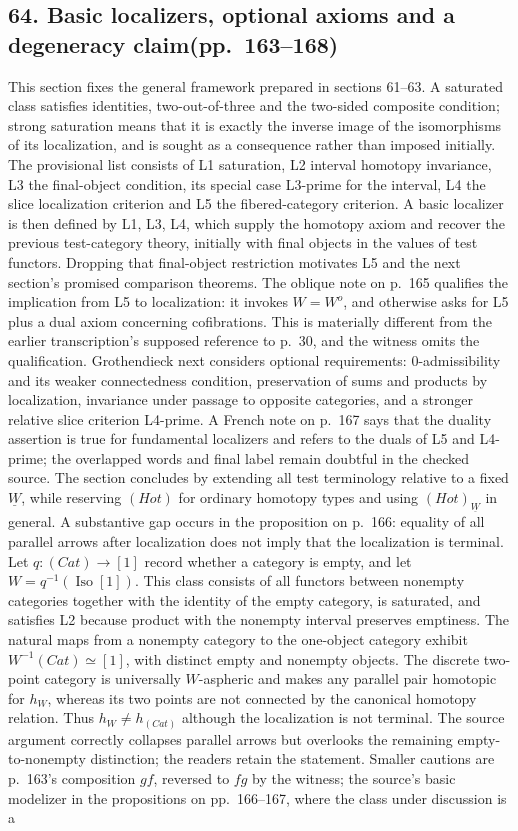 \subsection*{64. Basic localizers, optional axioms and a degeneracy claim\newline (pp.~163--168)}
This section fixes the general framework prepared in sections 61--63. A saturated class satisfies identities, two-out-of-three and the two-sided composite condition; strong saturation means that it is exactly the inverse image of the isomorphisms of its localization, and is sought as a consequence rather than imposed initially. The provisional list consists of L1 saturation, L2 interval homotopy invariance, L3 the final-object condition, its special case L3-prime for the interval, L4 the slice localization criterion and L5 the fibered-category criterion. A basic localizer is then defined by L1, L3, L4, which supply the homotopy axiom and recover the previous test-category theory, initially with final objects in the values of test functors. Dropping that final-object restriction motivates L5 and the next section's promised comparison theorems. The oblique note on p.~165 qualifies the implication from L5 to localization: it invokes $W=W^o$, and otherwise asks for L5 plus a dual axiom concerning cofibrations. This is materially different from the earlier transcription's supposed reference to p.~30, and the witness omits the qualification. Grothendieck next considers optional requirements: 0-admissibility and its weaker connectedness condition, preservation of sums and products by localization, invariance under passage to opposite categories, and a stronger relative slice criterion L4-prime. A French note on p.~167 says that the duality assertion is true for fundamental localizers and refers to the duals of L5 and L4-prime; the overlapped words and final label remain doubtful in the checked source. The section concludes by extending all test terminology relative to a fixed $\underline W$, while reserving $(Hot)$ for ordinary homotopy types and using $(Hot)_{\underline W}$ in general. A substantive gap occurs in the proposition on p.~166: equality of all parallel arrows after localization does not imply that the localization is terminal. Let $q:(Cat)\to[1]$ record whether a category is empty, and let $W=q^{-1}(\operatorname{Iso}[1])$. This class consists of all functors between nonempty categories together with the identity of the empty category, is saturated, and satisfies L2 because product with the nonempty interval preserves emptiness. The natural maps from a nonempty category to the one-object category exhibit $W^{-1}(Cat)\simeq[1]$, with distinct empty and nonempty objects. The discrete two-point category is universally $W$-aspheric and makes any parallel pair homotopic for $h_W$, whereas its two points are not connected by the canonical homotopy relation. Thus $h_W\ne h_{(Cat)}$ although the localization is not terminal. The source argument correctly collapses parallel arrows but overlooks the remaining empty-to-nonempty distinction; the readers retain the statement. Smaller cautions are p.~163's composition $gf$, reversed to $fg$ by the witness; the source's basic modelizer in the propositions on pp.~166--167, where the class under discussion is a 
